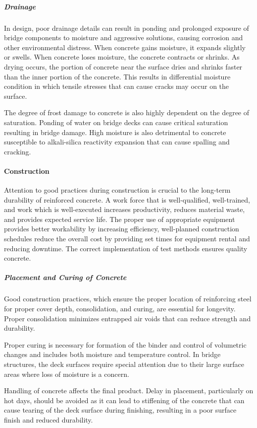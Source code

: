 \subparagraph{Drainage}

In design, poor drainage details can result in ponding and prolonged exposure of bridge components to moisture
and aggressive solutions, causing corrosion and other environmental distress. When concrete gains moisture, it
expands slightly or swells. When concrete loses moisture, the concrete contracts or shrinks. As drying occurs, the
portion of concrete near the surface dries and shrinks faster than the inner portion of the concrete. This results in
differential moisture condition in which tensile stresses that can cause cracks may occur on the surface.

The degree of frost damage to concrete is also highly dependent on the degree of saturation. Ponding of water on
bridge decks can cause critical saturation resulting in bridge damage. High moisture is also detrimental to concrete
susceptible to alkali-silica reactivity expansion that can cause spalling and cracking.

\paragraph{Construction}
Attention to good practices during construction is crucial to the long-term durability of reinforced concrete. A
work force that is well-qualified, well-trained, and work which is well-executed increases productivity, reduces
material waste, and provides expected service life. The proper use of appropriate equipment provides better
workability by increasing efficiency, well-planned construction schedules reduce the overall cost by providing set
times for equipment rental and reducing downtime. The correct implementation of test methods ensures quality
concrete.
\subparagraph{Placement and Curing of Concrete}
Good construction practices, which ensure the proper location of reinforcing steel for proper cover depth,
consolidation, and curing, are essential for longevity. Proper consolidation minimizes entrapped air voids that can
reduce strength and durability.

Proper curing is necessary for formation of the binder and control of volumetric changes and includes both
moisture and temperature control. In bridge structures, the deck surfaces require special attention due to their large
surface areas where loss of moisture is a concern.

Handling of concrete affects the final product. Delay in placement, particularly on hot days, should be avoided as
it can lead to stiffening of the concrete that can cause tearing of the deck surface during finishing, resulting in a poor
surface finish and reduced durability.


